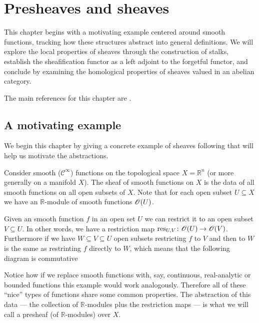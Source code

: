\documentclass[../../main]{subfiles}
\begin{document}
\chapter{Presheaves and sheaves}\label{ch:presheaves-and-sheaves}

This chapter begins with a motivating example centered around smooth functions, tracking how these structures abstract into general definitions.
We will explore the local properties of sheaves through the construction of stalks, establish the sheafification functor as a left adjoint to the forgetful functor, and conclude by examining the homological properties of sheaves valued in an abelian category.

The main references for this chapter are \cite{vakilRISINGSEAFoundations2025, hartshorneAlgebraicGeometry1977, stacks-project}.

\section{A motivating example}\label{sec:motivating-example-sheaves}
We begin this chapter by giving a concrete example of sheaves following \cite{vakilRISINGSEAFoundations2025} that will help us motivate the abstractions.

Consider smooth (\(\mathcal{C}^{\infty}\)) functions on the topological space \(X = \mathbb{R}^{n}\) (or more generally on a manifold \(X\)).
The sheaf of smooth functions on \(X\) is the data of all smooth functions on all open subsets of \(X\).
Note that for each open subset \(U \subseteq X\) we have an \(\mathbb{R}\)-module of smooth functions \(\mathscr{O}(U)\).

Given an smooth function \(f\) in an open set \(U\) we can restrict it to an open subset \(V \subseteq U\).
In other words, we have a restriction map \(\operatorname{res}_{U, V}\colon \mathscr{O}(U) \to \mathscr{O}(V)\).
Furthermore if we have \(W \subseteq V \subseteq U\) open subsets restricting \(f\) to \(V\) and then to \(W\) is the same as restrinting \(f\) directly to \(W\), which means that the following diagram is commutative
\begin{center}
\end{center}

Notice how if we replace smooth functions with, say, continuous, real-analytic or bounded functions this example would work analogously.
Therefore all of these ``nice'' types of functions share some common properties.
The abstraction of this data --- the collection of \(\mathbb{R}\)-modules plus the restriction maps --- is what we will call a presheaf (of \(\mathbb{R}\)-modules) over \(X\).
\end{document}
